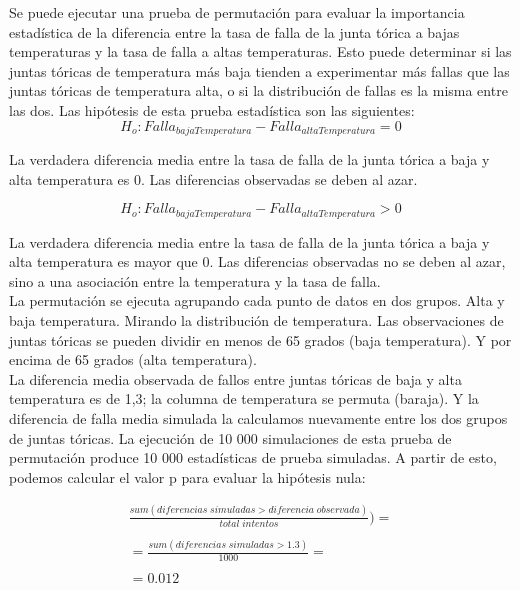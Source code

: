 Se puede ejecutar una prueba de permutaci\'on para evaluar la importancia
estad\'istica de la diferencia entre la tasa de falla de la junta t\'orica a
bajas temperaturas y la tasa de falla a altas temperaturas. Esto puede
determinar si las juntas t\'oricas de temperatura m\'as baja tienden a
experimentar m\'as fallas que las juntas t\'oricas de temperatura alta, o si la
distribuci\'on de fallas es la misma entre las dos. Las hip\'otesis de esta
prueba estad\'istica son las siguientes:\\

\begin{equation} 
    H_o: Falla_{bajaTemperatura} - Falla_{altaTemperatura} = 0
\end{equation} 

La verdadera diferencia media entre la tasa de falla de la junta t\'orica a baja
y alta temperatura es 0. Las diferencias observadas se deben al azar.


\begin{equation}   
    H_o: Falla_{bajaTemperatura} - Falla_{altaTemperatura} > 0
\end{equation} 


La verdadera diferencia media entre la tasa de falla de la junta t\'orica a baja
y alta temperatura es mayor que 0. Las diferencias observadas no se deben al
azar, sino a una asociaci\'on entre la temperatura y la tasa de falla.\\

La permutaci\'on se ejecuta agrupando cada punto de datos en dos grupos. Alta y
baja temperatura. Mirando la distribuci\'on de temperatura. Las observaciones de
juntas t\'oricas se pueden dividir en menos de 65 grados (baja temperatura). Y
por encima de 65 grados (alta temperatura).\\

La diferencia media observada de fallos entre juntas t\'oricas de baja y alta
temperatura es de 1,3; la columna de temperatura se permuta (baraja). Y la
diferencia de falla media simulada la calculamos nuevamente entre los dos grupos
de juntas t\'oricas. La ejecuci\'on de 10 000 simulaciones de esta prueba de
permutaci\'on produce 10 000 estad\'isticas de prueba simuladas. A partir de
esto, podemos calcular el valor p para evaluar la hip\'otesis nula:

\begin{equation} \label{eq1}
    \begin{split}
\frac{sum(diferencias\;simuladas> diferencia\;observada)}{total\; intentos})=\\ \\
= \frac{sum(diferencias \;simuladas>1.3)}{1000}= \\ \\
=0.012
    \end{split}
\end{equation}


